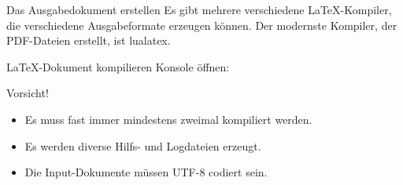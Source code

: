\begin{frame}[fragile]{Das Ausgabedokument erstellen}
  Es gibt mehrere verschiedene \LaTeX-Kompiler, die verschiedene Ausgabeformate erzeugen können.
  Der modernste Kompiler, der PDF-Dateien erstellt, ist \alert{lualatex}.

  \begin{block}{\LaTeX-Dokument kompilieren}
    Konsole öffnen:
  \end{block}
  \begin{alertblock}{Vorsicht!}
    \begin{itemize}
      \item Es muss fast immer mindestens zweimal kompiliert werden.
      \item Es werden diverse Hilfs- und Logdateien erzeugt.
      \item Die Input-Dokumente müssen UTF-8 codiert sein.
    \end{itemize}
  \end{alertblock}
\end{frame}
